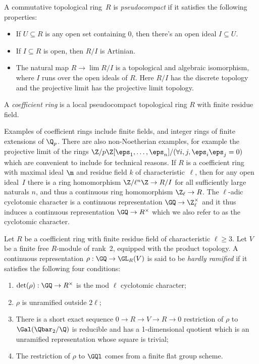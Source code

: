 \begin{definition} A commutative topological ring~$R$ is \emph{pseudocompact} if it satisfies
  the following properties:
  \begin{itemize}
    \item If $U\subseteq R$ is any open set containing 0, then there's an open ideal $I\subseteq U$.
    \item If $I\subseteq R$ is open, then $R/I$ is Artinian.
    \item The natural map $R\to\lim R/I$ is a topological and algebraic isomorphism, where $I$ runs
      over the open ideals of $R$. Here $R/I$ has the discrete topology and the projective
      limit has the projective limit topology.
  \end{itemize}
\end{definition}

\begin{definition} A \emph{coefficient ring} is a local pseudocompact topological ring $R$ with
  finite residue field.
\end{definition}

Examples of coefficient rings include finite fields, and integer rings of finite extensions
of $\Q_p$. There are also non-Noetherian examples, for example the projective limit of
the rings $\Z/p\Z[\eps_1,\ldots,\eps_n]/(\forall i,j,\eps_i\eps_j=0)$
which are convenient to include
for technical reasons. If $R$ is a coefficient ring with maximal ideal $\m$
and residue field $k$ of characteristic~$\ell$, then for any open ideal~$I$ there is
a ring homomorphism $\Z/\ell^n\Z\to R/I$ for all sufficiently large naturals $n$,
and thus a continuous ring homomorphism $\Z_{\ell}\to R$. The $\ell$-adic cyclotomic character
is a continuous
representation $\GQ\to\Z_{\ell}^\times$ and it thus induces a continuous
representation $\GQ\to R^\times$ which we also refer to as the cyclotomic character.

\begin{definition}
  \label{hardly_ramified}
  Let $R$ be a coefficient ring with finite residue field of characteristic $\ell\geq3$.
  Let $V$ be a finite free $R$-module of rank~2, equipped with the product topology. A
  continuous representation $\rho: \GQ\to \GL_R(V)$ is said to be \emph{hardly ramified} if it
  satisfies the following four conditions:
  \begin{enumerate}
  \item $\det(\rho):\GQ\to R^\times$ is the mod $\ell$ cyclotomic character;
  \item $\rho$ is unramified outside $2\ell$;
  \item There is a short exact sequence $0\to R\to V\to R\to 0$ restriction of $\rho$ to $\Gal(\Qbar_2/\Q)$ is reducible and has a
    1-dimensional quotient which is an unramified representation whose square is trivial;
  \item The restriction of $\rho$ to $\GQl$ comes from a finite flat group scheme.
  \end{enumerate}
\end{definition}

